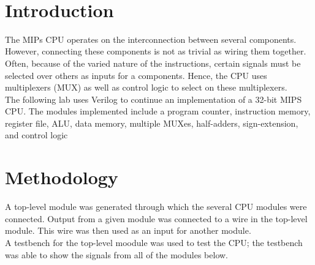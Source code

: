 \documentclass[twocolumn]{article}
\begin{document}
\

{\newpage}

\maketitle        


\section{Introduction}

The MIPs CPU operates on the interconnection between several components. However, connecting these components is not as trivial as wiring them together. Often, because of the varied nature of the instructions, certain signals must be selected over others as inputs for a components. Hence, the CPU uses multiplexers (MUX) as well as control logic to select on these multiplexers. \\

The following lab uses Verilog to continue an implementation of a 32-bit MIPS CPU. The modules implemented include a program counter, instruction memory, register file, ALU, data memory, multiple MUXes, half-adders, sign-extension, and control logic

\section{Methodology}

A top-level module was generated through which the several CPU modules were connected. Output from a given module was connected to a wire in the top-level module. This wire was then used as an input for another module. \\

A testbench for the top-level moodule was used to test the CPU; the testbench was able to show  the signals from all of the modules below. 
\end{document}
